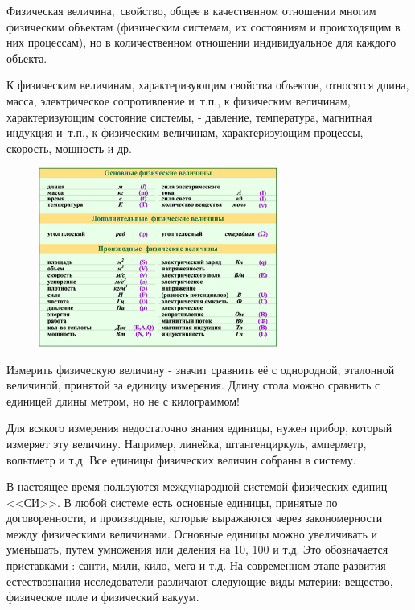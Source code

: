 \documentclass[a6paper, 11pt]{diss_4}
\renewcommand{\'}{\,'}
\begin{document}
Физическая величина, свойство, общее в качественном отношении многим физическим
объектам (физическим системам, их состояниям и происходящим в них
процессам), но в количественном отношении индивидуальное для каждого объекта.

 К физическим величинам, характеризующим свойства объектов, относятся длина,
масса, электрическое сопротивление и т.п., к физическим величинам,
характеризующим состояние системы, - давление, температура, магнитная
индукция и т.п., к физическим величинам, характеризующим процессы, -
скорость, мощность и др.

\begin{figure}[h]
\begin{center}
\includegraphics*[width=0.7\textwidth]{img/img01.eps}
\label{fig1}
\end{center}\end{figure}

 Измерить физическую величину - значит сравнить её с однородной, эталонной
величиной, принятой за единицу измерения. Длину стола можно сравнить с
единицей длины метром, но не с килограммом!

 Для всякого измерения недостаточно знания единицы, нужен прибор, который
измеряет эту величину. Например, линейка, штангенциркуль, амперметр,
вольтметр и т.д. Все единицы физических величин собраны в систему.

 В настоящее время пользуются международной системой физических единиц - <<СИ>>.
В любой системе есть основные единицы, принятые по договоренности, и
производные, которые выражаются через закономерности между физическими
величинами. Основные единицы можно увеличивать и уменьшать, путем умножения
или деления на 10, 100 и т.д. Это обозначается приставками : санти, мили,
кило, мега и т.д. На современном этапе развития естествознания исследователи
различают следующие виды материи: вещество, физическое поле и физический
вакуум.
\end{document}
